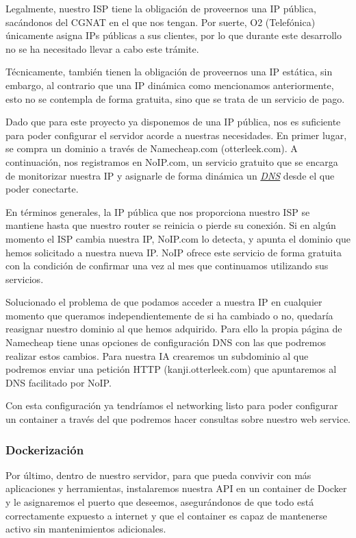 \documentclass{article}
\begin{document}
Legalmente, nuestro ISP tiene la obligación de proveernos una IP pública, sacándonos del CGNAT en el que nos tengan. Por suerte, O2 (Telefónica) únicamente asigna IPs públicas a sus clientes, por lo que durante este desarrollo no se ha necesitado llevar a cabo este trámite.

Técnicamente, también tienen la obligación de proveernos una IP estática, sin embargo, al contrario que una IP dinámica como mencionamos anteriormente, esto no se contempla de forma gratuita, sino que se trata de un servicio de pago.

Dado que para este proyecto ya disponemos de una IP pública, nos es suficiente para poder configurar el servidor acorde a nuestras necesidades. En primer lugar, se compra un dominio a través de Namecheap.com (otterleek.com). A continuación, nos registramos en NoIP.com, un servicio gratuito que se encarga de monitorizar nuestra IP y asignarle de forma dinámica un \hyperref[sec:terms]{\textit{DNS}\tec} desde el que poder conectarte.

En términos generales, la IP pública que nos proporciona nuestro ISP se mantiene hasta que nuestro router se reinicia o pierde su conexión. Si en algún momento el ISP cambia nuestra IP, NoIP.com lo detecta, y apunta el dominio que hemos solicitado a nuestra nueva IP. NoIP ofrece este servicio de forma gratuita con la condición de confirmar una vez al mes que continuamos utilizando sus servicios.

Solucionado el problema de que podamos acceder a nuestra IP en cualquier momento que queramos independientemente de si ha cambiado o no, quedaría reasignar nuestro dominio al que hemos adquirido. Para ello la propia página de Namecheap tiene unas opciones de configuración DNS con las que podremos realizar estos cambios. Para nuestra IA crearemos un subdominio al que podremos enviar una petición HTTP (kanji.otterleek.com) que apuntaremos al DNS facilitado por NoIP.

Con esta configuración ya tendríamos el networking listo para poder configurar un container a través del que podremos hacer consultas sobre nuestro web service.

\subsubsection{Dockerización}
Por último, dentro de nuestro servidor, para que pueda convivir con más aplicaciones y herramientas, instalaremos nuestra API en un container de Docker y le asignaremos el puerto que deseemos, asegurándonos de que todo está correctamente expuesto a internet y que el container es capaz de mantenerse activo sin mantenimientos adicionales.
\end{document}
